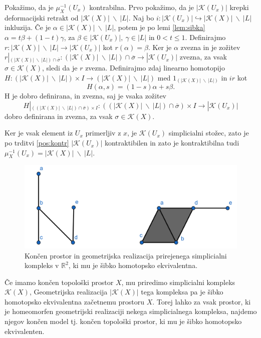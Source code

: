 \documentclass[mat1]{fmfdelo}
\newcommand{\R}{\mathbb R}
\begin{document}
\begin{dokaz}
    Pokažimo, da je $\mu_X^{-1}(U_x)$ kontrabilna. Prvo pokažimo, da je 
    $|\mathcal{K}(U_x)|$ krepki deformacijski retrakt 
    od $|\mathcal{K}(X)|\ \backslash \ |L|$. Naj bo $i\colon |\mathcal{K}(U_x)|\hookrightarrow |\mathcal{K}
    (X)|\ \backslash \ |L|$ inkluzija. Če je $\alpha \in |\mathcal{K}(X)|\ 
    \backslash \ |L|$, potem je po lemi \ref{lem:sibka}  $\alpha = t\beta + 
    (1-t)\gamma$, za $\beta \in |\mathcal{K}(U_x)|, \ \gamma \in |L|$ in $0<t\leq 1$. 
    Definirajmo $r\colon |\mathcal{K}(X)|\ \backslash \ |L|\rightarrow |\mathcal{K}(U_x)|$ 
    kot $r(\alpha)=\beta$. Ker je $\alpha$ zvezna in je zožitev $r|_{(|\mathcal{K}(X)|\ \backslash \ |L|)\cap 
    \overline{\sigma}}\colon (|\mathcal{K}(X)|\ \backslash \ |L|)\cap 
    \overline{\sigma} \rightarrow |\mathcal{K}(U_x)|$ zvezna, za vsak 
    $\sigma \in \mathcal{K}(X)$, sledi da je $r$ zvezna. Definirajmo zdaj linearno homotopijo $H\colon (|\mathcal{K}(X)|\ \backslash \ |L|) \times I \rightarrow (|\mathcal{K}(X)|\ \backslash \ |L|)$ med $1_{(|\mathcal{K}(X)|\ \backslash \ |L|)}$ in $ir$ kot 
    $$
    H(\alpha,s)=(1-s)\alpha + s\beta.
    $$
    H je dobro definirana, in zvezna, saj je vsaka zožitev 
    $$
    H|_{((|\mathcal{K}(X)|\ \backslash \ |L|)\cap 
    \overline{\sigma})\times I}\colon ((|\mathcal{K}(X)|\ \backslash \ |L|)\cap 
    \overline{\sigma})\times I \rightarrow |\mathcal{K}(U_x)|
    $$
    dobro definirana in zvezna, za vsak $\sigma \in \mathcal{K}(X)$.

    Ker je vsak element iz $U_x$ primerljiv z $x$, je $\mathcal{K}(U_x)$ 
    simplicialni stožec, zato je po trditvi \ref{pos:kontr} $|\mathcal{K}(U_x)|$ 
    kontraktibilen in zato je kontraktibilna tudi $\mu_X^{-1}
    (U_x)=|\mathcal{K}(X)|\ \backslash \ |L|$.
\end{dokaz}


\begin{figure}[h]
    \centering
    \includegraphics[width=1\linewidth]{simp.png}
    \caption{Končen prostor in geometrijska realizacija prirejenega simplicialni kompleks v $\R^2$, ki mu je šibko homotopsko ekvivalentna.}
\end{figure}
Če imamo končen topološki prostor $X$, mu priredimo simplicialni kompleks
$\mathcal{K}(X)$, Geometrijska realizacija $|\mathcal{K}(X)|$ tega kompleksa pa je šibko homotopsko ekvivalentna 
začetnemu prostoru $X$. Torej lahko za vsak prostor, ki je homeomorfen geometrijski realizaciji
nekega simplicialnega kompleksa, najdemo njegov končen model tj. končen topološki prostor, ki mu
je šibko homotopsko ekvivalenten.
\end{document}

